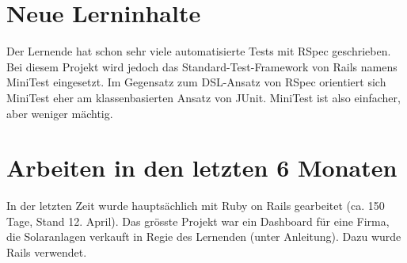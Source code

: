 \section{Neue Lerninhalte}

Der Lernende hat schon sehr viele automatisierte Tests mit RSpec geschrieben. Bei diesem Projekt wird jedoch das Standard-Test-Framework von Rails namens MiniTest eingesetzt. Im Gegensatz zum DSL-Ansatz von RSpec orientiert sich MiniTest eher am klassenbasierten Ansatz von JUnit. MiniTest ist also einfacher, aber weniger mächtig.

\section{Arbeiten in den letzten 6 Monaten}

In der letzten Zeit wurde hauptsächlich mit Ruby on Rails gearbeitet (ca. 150 Tage, Stand 12. April). Das grösste Projekt war ein Dashboard für eine Firma, die Solaranlagen verkauft in Regie des Lernenden (unter Anleitung). Dazu wurde Rails verwendet.

